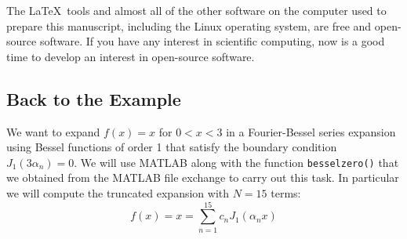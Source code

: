 The \LaTeX\ tools and almost all of the other software on the computer used to prepare this manuscript, including the Linux operating system, are free and open-source software. If you have any interest in scientific computing, now is a good time to develop an interest in open-source software.

\subsection{Back to the Example}
We want to expand $f(x)=x$ for $0<x<3$ in a Fourier-Bessel series expansion using Bessel functions of order 1 that satisfy the boundary condition $J_{1}(3\alpha_n)=0$.  We will use MATLAB along with the function \lstinline[style=myMatlab]{besselzero()} that we obtained from the MATLAB file exchange to carry out this task. In particular we will compute the truncated expansion with $N=15$ terms:
\begin{equation*}
f(x) = x = \sum\limits_{n=1}^{15}c_n J_1\left(\alpha_n x\right)
\end{equation*}

